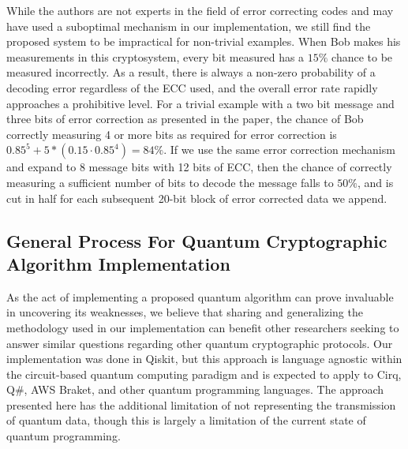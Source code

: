 \documentclass[sigconf]{acmart}
\begin{document}
While the authors are not experts in the field of error correcting codes and may have used a suboptimal mechanism in our implementation, we still find the proposed system to be impractical for non-trivial examples. When Bob makes his measurements in this cryptosystem, every bit measured has a $15\%$ chance to be measured incorrectly. As a result, there is always a non-zero probability of a decoding error regardless of the ECC used, and the overall error rate rapidly approaches a prohibitive level. For a trivial example with a two bit message and three bits of error correction as presented in the paper, the chance of Bob correctly measuring 4 or more bits as required for error correction is $0.85^5 + 5*(0.15\cdot 0.85^4) = 84\%$. If we use the same error correction mechanism and expand to 8 message bits with 12 bits of ECC, then the chance of correctly measuring a sufficient number of bits to decode the message falls to $50\%$, and is cut in half for each subsequent 20-bit block of error corrected data we append.


\subsection{General Process For Quantum Cryptographic Algorithm Implementation}
As the act of implementing a proposed quantum algorithm can prove invaluable in uncovering its weaknesses, we believe that sharing and generalizing the methodology used in our implementation can benefit other researchers seeking to answer similar questions regarding other quantum cryptographic protocols. Our implementation was done in Qiskit, but this approach is language agnostic within the circuit-based quantum computing paradigm and is expected to apply to Cirq, Q\#, AWS Braket, and other quantum programming languages. The approach presented here has the additional limitation of not representing the transmission of quantum data, though this is largely a limitation of the current state of quantum programming.
\end{document}
